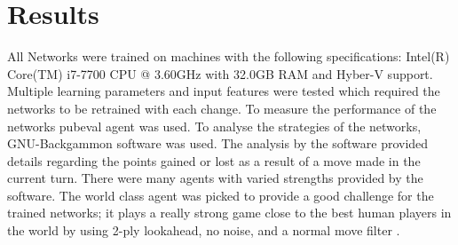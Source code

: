 \documentclass[12pt,a4paper]{article}
\begin{document}
\section{Results}
All Networks were trained on machines with the following specifications: Intel(R) Core(TM) i7-7700 CPU @ 3.60GHz with 32.0GB RAM and Hyber-V support. Multiple learning parameters and input features were tested which required the networks to be retrained with each change. To measure the performance of the networks pubeval agent was used. To analyse the strategies of the networks, GNU-Backgammon software was used. The analysis by the software provided details regarding the points gained or lost as a result of a move made in the current turn. There were many agents with varied strengths provided by the software. The world class agent was picked to provide a good challenge for the trained networks; it plays a really strong game close to the best human players in the world by using 2-ply lookahead, no noise, and a normal move filter \cite{gnubg}.
\end{document}
